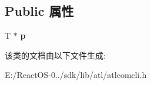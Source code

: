 \subsection*{Public 属性}
\begin{DoxyCompactItemize}
\item 
\mbox{\label{class_a_t_l_1_1_c_com_ptr_a45a0a0f5c55c8e17e3a6f0ee047d05e3}} 
T $\ast$ {\bfseries p}
\end{DoxyCompactItemize}


该类的文档由以下文件生成\+:\begin{DoxyCompactItemize}
\item 
E\+:/\+React\+O\+S-\/0../sdk/lib/atl/atlcomcli.\+h\end{DoxyCompactItemize}
